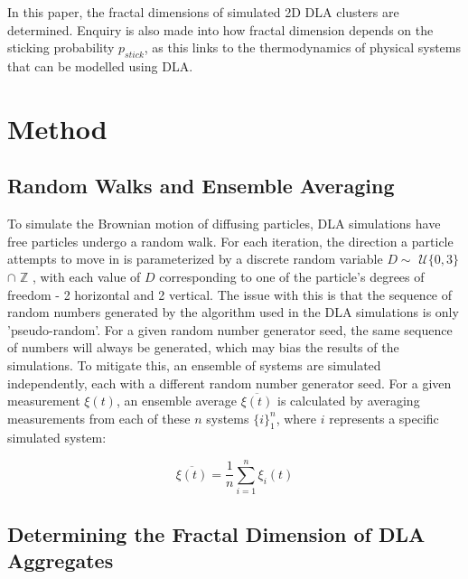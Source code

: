 \documentclass[11pt]{iopart}
\begin{document}
In this paper, the fractal dimensions of simulated 2D DLA clusters are determined. Enquiry is also made into how fractal dimension depends on the sticking probability $p_{stick}$, as this links to the thermodynamics of physical systems that can be modelled using DLA.

\section{Method}
\subsection{Random Walks and Ensemble Averaging}
To simulate the Brownian motion of diffusing particles, DLA simulations have free particles undergo a random walk. For each iteration, the direction a particle attempts to move in is parameterized by a discrete random variable $D \sim$ $\mathcal{U}\{0, 3\}$ $\cap$ $\mathbb{Z}$ , with each value of $D$ corresponding to one of the particle's degrees of freedom - 2 horizontal and 2 vertical. The issue with this is that the sequence of random numbers generated by the algorithm used in the DLA simulations is only 'pseudo-random'. For a given random number generator seed, the same sequence of numbers will always be generated, which may bias the results of the simulations. To mitigate this, an ensemble of systems are simulated independently, each with a different random number generator seed. For a given measurement $\xi(t)$, an ensemble average $\overline{\xi(t)}$ is calculated by averaging measurements from each of these $n$ systems $\{i\}_1^n$, where $i$ represents a specific simulated system:


\begin{equation}
\label{averageequation}
\overline{\xi(t)} = \frac{1}{n}\sum_{i=1}^{n}{\xi_i(t)}
\end{equation}


\subsection{Determining the Fractal Dimension of DLA Aggregates}
\end{document}
